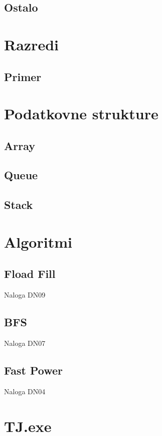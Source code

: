 \documentclass[a4paper,oneside,12pt]{article}
\theoremstyle{definition}
\begin{document}
		\subsection{Ostalo}

\section{Razredi}
	\subsection{Primer}

\section{Podatkovne strukture}
	\subsection{Array}
	\subsection{Queue}
	\subsection{Stack}

\section{Algoritmi}
	\subsection{Fload Fill}
		Naloga DN09\\
	\subsection{BFS}
		Naloga DN07\\
	\subsection{Fast Power}
		Naloga DN04\\
\section{TJ.exe}
\end{document}

